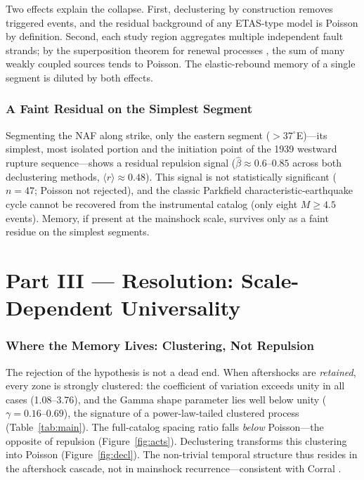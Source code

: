 \documentclass[12pt,a4paper]{article}
\begin{document}
Two effects explain the collapse. First, declustering by construction removes triggered events, and the residual background of any ETAS-type model is Poisson by definition. Second, each study region aggregates multiple independent fault strands; by the superposition theorem for renewal processes \citep{daley2003}, the sum of many weakly coupled sources tends to Poisson. The elastic-rebound memory of a single segment is diluted by both effects.

\section{A Faint Residual on the Simplest Segment}

Segmenting the NAF along strike, only the eastern segment ($>37^\circ$E)---its simplest, most isolated portion and the initiation point of the 1939 westward rupture sequence---shows a residual repulsion signal ($\hat\beta\approx0.6$--$0.85$ across both declustering methods, $\langle r\rangle\approx0.48$). This signal is not statistically significant ($n=47$; Poisson not rejected), and the classic Parkfield characteristic-earthquake cycle cannot be recovered from the instrumental catalog (only eight $M\geq4.5$ events). Memory, if present at the mainshock scale, survives only as a faint residue on the simplest segments.

\part*{Part III --- Resolution: Scale-Dependent Universality}

\section{Where the Memory Lives: Clustering, Not Repulsion}

The rejection of the hypothesis is not a dead end. When aftershocks are \emph{retained}, every zone is strongly clustered: the coefficient of variation exceeds unity in all cases (1.08--3.76), and the Gamma shape parameter lies well below unity ($\gamma=0.16$--$0.69$), the signature of a power-law-tailed clustered process (Table~\ref{tab:main}). The full-catalog spacing ratio falls \emph{below} Poisson---the opposite of repulsion (Figure~\ref{fig:acts}). Declustering transforms this clustering into Poisson (Figure~\ref{fig:decl}). The non-trivial temporal structure thus resides in the aftershock cascade, not in mainshock recurrence---consistent with Corral \citep{corral2004}.
\end{document}
